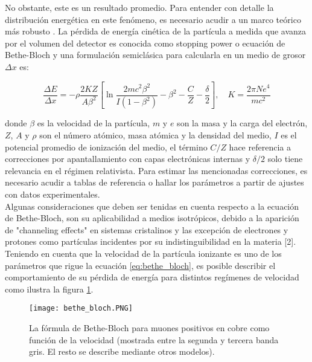 \documentclass{report}
\begin{document}
\noindent No obstante, este es un resultado promedio. Para entender con detalle la distribución energética en este fenómeno, es necesario acudir a un marco teórico más robusto \cite{fano1963penetration} \cite{northcliffe1963passage}. La pérdida de energía cinética de la partícula a medida que avanza por el volumen del detector es conocida como stopping power o ecuación de Bethe-Bloch y una formulación semiclásica para calcularla en un medio de grosor $\Delta x$ es: 

\begin{equation}
    \label{eq:bethe_bloch}
    \frac{\Delta E}{\Delta x}=-\rho \frac{2 K Z}{A \beta^2}\left[\ln \frac{2 m c^2 \beta^2}{I\left(1-\beta^2\right)}-\beta^2-\frac{C}{Z}-\frac{\delta}{2}\right], \quad K = \frac{2 \pi N e^{4}}{mc^{2}}
    \end{equation}

\noindent donde $\beta$ es la velocidad de la partícula, $m$ y $e$ son la masa y la carga del electrón, $Z$, $A$ y $\rho$ son el número atómico, masa atómica y la densidad del medio, $I$ es el potencial promedio de ionización del medio, el término $C/Z$ hace referencia a correcciones por apantallamiento con capas electrónicas internas y $\delta /2$ solo tiene relevancia en el régimen relativista. Para estimar las mencionadas correcciones, es necesario acudir a tablas de referencia o hallar los parámetros a partir de ajustes con datos experimentales.\\ 

\noindent Algunas consideraciones que deben ser tenidas en cuenta respecto a la ecuación de Bethe-Bloch, son su aplicabilidad a medios isotrópicos, debido a la aparición de "channeling effects" en sistemas cristalinos y las excepción de electrones y protones como partículas incidentes por su indistinguibilidad en la materia [2].\\

\noindent Teniendo en cuenta que la velocidad de la partícula ionizante es uno de los parámetros que rigue la ecuación \ref{eq:bethe_bloch}, es posible describir el comportamiento de su pérdida de energía para distintos regímenes de velocidad como ilustra la figura \ref{fig:bethe_b}.

\begin{figure}[H]
    \centering
    \texttt{[image: bethe\_bloch.PNG]}
    \caption{La fórmula de Bethe-Bloch para muones positivos en cobre como función de la velocidad \cite{morisbak2010search} (mostrada entre la segunda y tercera banda gris. El resto se describe mediante otros modelos).}
    \label{fig:bethe_b}

\end{figure}
\end{document}
